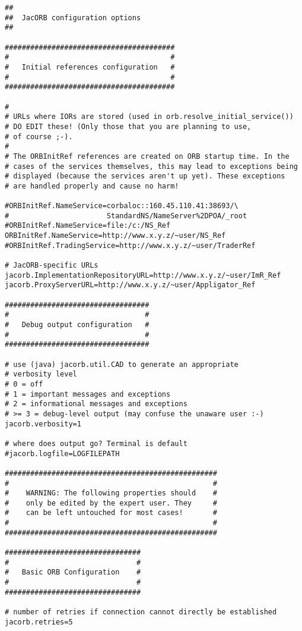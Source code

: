 \documentclass[12pt]{scrbook}
\begin{document}
\renewcommand{\baselinestretch}{0.9}
\small{
\begin{verbatim}
##
##  JacORB configuration options
##

########################################
#                                      #
#   Initial references configuration   #
#                                      #
########################################

#
# URLs where IORs are stored (used in orb.resolve_initial_service())
# DO EDIT these! (Only those that you are planning to use,
# of course ;-). 
#
# The ORBInitRef references are created on ORB startup time. In the 
# cases of the services themselves, this may lead to exceptions being 
# displayed (because the services aren't up yet). These exceptions
# are handled properly and cause no harm! 

#ORBInitRef.NameService=corbaloc::160.45.110.41:38693/\
#                       StandardNS/NameServer%2DPOA/_root
#ORBInitRef.NameService=file:/c:/NS_Ref
ORBInitRef.NameService=http://www.x.y.z/~user/NS_Ref
#ORBInitRef.TradingService=http://www.x.y.z/~user/TraderRef

# JacORB-specific URLs
jacorb.ImplementationRepositoryURL=http://www.x.y.z/~user/ImR_Ref
jacorb.ProxyServerURL=http://www.x.y.z/~user/Appligator_Ref

##################################
#                                #
#   Debug output configuration   #
#                                #
##################################

# use (java) jacorb.util.CAD to generate an appropriate
# verbosity level 
# 0 = off
# 1 = important messages and exceptions
# 2 = informational messages and exceptions
# >= 3 = debug-level output (may confuse the unaware user :-)
jacorb.verbosity=1

# where does output go? Terminal is default
#jacorb.logfile=LOGFILEPATH

##################################################
#                                                #
#    WARNING: The following properties should    # 
#    only be edited by the expert user. They     #
#    can be left untouched for most cases!       #
#                                                #
##################################################

################################
#                              #
#   Basic ORB Configuration    #
#                              #
################################

# number of retries if connection cannot directly be established
jacorb.retries=5


\end{verbatim}}
\end{document}

